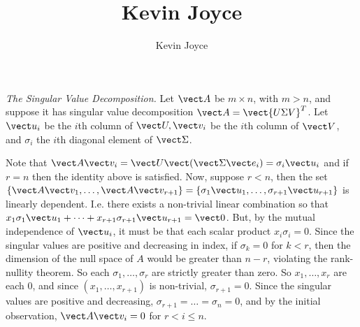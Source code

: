 \documentclass{homework}
\title{Kevin Joyce}
\author{Kevin Joyce}
\begin{document}
 
\newcommand{\figref}[1]{\figurename~\ref{#1}}
\renewcommand{\bar}{\overline}
\renewcommand{\hat}{\widehat}
\renewcommand{\SS}{\mathcal S}
\newcommand{\HH}{\mathscr H}
\newcommand{\mom}{\widetilde}
\newcommand{\mle}{\widehat \Uptheta}
\newcommand{\eps}{\varepsilon}
\newcommand{\todist}{\stackrel{D}\longrightarrow}
\newcommand{\toprob}{\stackrel{p}\longrightarrow}
\newcommand{\TTheta}{\overline{\underline \Theta} }
\newcommand{\del}{\partial}
\newcommand{\approxsim}{\overset{\cdotp}{\underset{\cdotp}{\sim}}}

\begin{longproblem}
  \emph{The Singular Value Decomposition.}  Let $\vect A$ be $m \times n$, with
  $m > n$, and suppose it has singular value decomposition $\vect A = \vect
  {U\Sigma V}^T$. Let $\vect u_i$ be the $i$th column of $\vect U, \vect v_i$
  be the $i$th column of $\vect V$, and $\sigma_i$ the $i$th diagonal element
  of $\vect \Sigma$. 

  \begin{solution}
    Note that $\vect A \vect v_i = \vect U \vect (\vect \Sigma \vect e_i)  =
    \sigma_i \vect u_i$ and if $r=n$ then the identity above is satisfied.
    Now, suppose $r<n$, then 
    the set $\{\vect A\vect v_1,\dots,\vect A \vect v_{r+1}\} = \{\sigma_1
    \vect u_1,\dots,\sigma_{r+1} \vect u_{r+1}\}$ is linearly dependent. I.e.
    there exists a non-trivial linear combination so that $x_1\sigma_1\vect u_1
    +\dots+ x_{r+1}\sigma_{r+1}\vect u_{r+1} = \vect0$.  But, by the mutual
    independence of $\vect u_i$, it must be that each scalar product $x_i
    \sigma_i = 0$. Since the singular values are positive and decreasing in
    index, if $\sigma_k = 0$ for $k<r$, then the dimension of the null space of
    $A$ would be greater than $n-r$, violating the rank-nullity theorem.  So each
    $\sigma_1,\dots,\sigma_r$ are strictly greater than zero.  So $x_1,\dots,x_r$ are
    each $0$, and since $(x_1,\dots,x_{r+1})$ is non-trivial, $\sigma_{r+1} = 0$.  Since
    the singular values are positive and decreasing, $\sigma_{r+1} = \dots = \sigma_n = 0$, and
    by the initial observation, $\vect A \vect v_{i} = 0$ for $r<i\le n$. 


\end{solution}
\end{longproblem}
\end{document}
